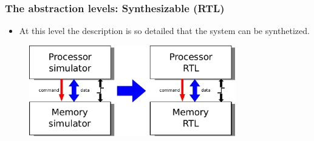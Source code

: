 {\begin{frame}
	\frametitle{The abstraction levels: Synthesizable (RTL)}
	\begin{itemize}
		\item<1-> At this level the description is so detailed that the system can be synthetized.
	\end{itemize}
	\begin{figure}[h]
		\includegraphics[width=0.8\textwidth]{introduction/figures/fibonacci_cycle_to_rtl_level.pdf}
	\end{figure}
\end{frame}
}

